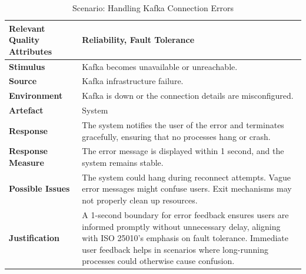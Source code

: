 \documentclass[10pt , a4paper]{report}
\begin{document}
\begin{small}
\begin{table}[h!tbp]
\centering
\renewcommand{\arraystretch}{1.3} %
\begin{tabular}{|l|p{9cm}|}
\hline
\textbf{Relevant Quality Attributes} & Reliability, Fault Tolerance \\ \hline
\textbf{Stimulus} & Kafka becomes unavailable or unreachable. \\ \hline
\textbf{Source} & Kafka infrastructure failure. \\ \hline
\textbf{Environment} & Kafka is down or the connection details are misconfigured. \\ \hline
\textbf{Artefact} & System \\ \hline
\textbf{Response} & The system notifies the user of the error and terminates gracefully, ensuring that no processes hang or crash. \\ \hline
\textbf{Response Measure} & The error message is displayed within 1 second, and the system remains stable. \\ \hline
\textbf{Possible Issues} & The system could hang during reconnect attempts. Vague error messages might confuse users. Exit mechanisms may not properly clean up resources. \\ \hline
\textbf{Justification} & A 1-second boundary for error feedback ensures users are informed promptly without unnecessary delay, aligning with ISO 25010’s emphasis on fault tolerance. Immediate user feedback helps in scenarios where long-running processes could otherwise cause confusion. \\ \hline
\end{tabular}
\caption{Scenario: Handling Kafka Connection Errors}
\end{table}


\end{small}
\end{document}
